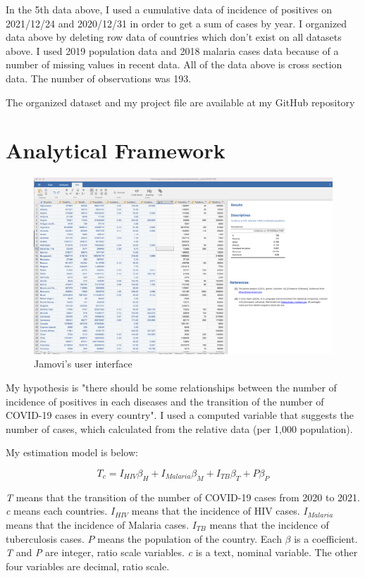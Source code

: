 \documentclass[12pt]{report}
\begin{document}
In the 5th data above, I used a cumulative data of incidence of positives on 2021/12/24 and 2020/12/31 in order to get a sum of cases by year.
I organized data above by deleting row data of countries which don't exist on all datasets above.
I used 2019 population data and 2018 malaria cases data because of a number of missing values in recent data.
All of the data above is cross section data. 
The number of observations was 193.


The organized dataset and my project file are available at my GitHub repository\cite{github}

\chapter{Analytical Framework}

\begin{figure}
    \centering
    \includegraphics[width=140mm]{img/jamovi.png}
    \caption{Jamovi's user interface}
    \label{fig:jamovi}
\end{figure}

My hypothesis is "there should be some relationships between the number of incidence of positives in each diseases and the transition of the number of COVID-19 cases in every country".
I used a computed variable that suggests the number of cases, which calculated from the relative data (per 1,000 population).

My estimation model is below:

\begin{equation}
    T_c = I_{HIV}\beta_H + I_{Malaria}\beta_M + I_{TB}\beta_T + P\beta_P
\end{equation}

{\it{T}} means that the transition of the number of COVID-19 cases from 2020 to 2021.
{\it{c}} means each countries.
{\it{$I_{HIV}$}} means that the incidence of HIV cases.
{\it{$I_{Malaria}$}} means that the incidence of Malaria cases.
{\it{$I_{TB}$}} means that the incidence of tuberculosis cases.
{\it{$P$}} means the population of the country.
Each {$\beta$} is a coefficient.
{\it{T}} and {\it{P}} are integer, ratio scale variables.
{\it{c}} is a text, nominal variable.
The other four variables are decimal, ratio scale.
\end{document}

